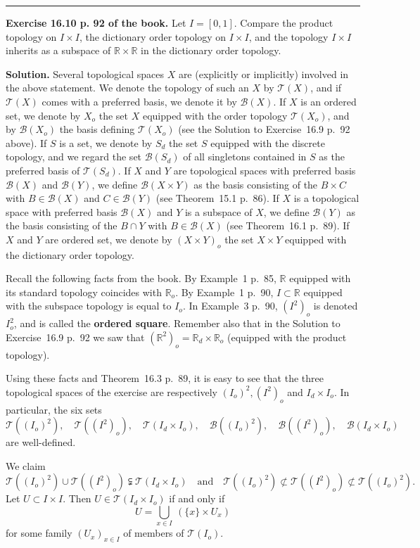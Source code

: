 \documentclass[12pt,letterpaper]{article}
\newcommand{\B}{\mathcal B}
\newcommand{\hs}{\bigskip\hrule\medskip}
\newcommand{\mc}{\mathcal}
\newcommand{\noi}{\noindent}%
\newcommand{\R}{\mathbb R}
\newcommand{\T}{\mathcal T}
\begin{document}
\hs


\noi\textbf{Exercise 16.10 p. 92 of the book.} Let $I=[0,1]$. Compare the product topology on $I\times I$, the dictionary order topology on $I\times I$, and the topology $I\times I$ inherits as a subspace of $\R\times\R$ in the dictionary order topology. 

\noi\textbf{Solution.} Several topological spaces $X$ are (explicitly or implicitly) involved in the above statement. We denote the topology of such an $X$ by $\T(X)$, and if $\T(X)$ comes with a preferred basis, we denote it by $\B(X)$. If $X$ is an ordered set, we denote by $X_o$ the set $X$ equipped with the order topology $\T(X_o)$, and by $\B(X_o)$ the basis defining $\mc T(X_o)$ (see the Solution to Exercise~16.9 p.~92 above). If $S$ is a set, we denote by $S_d$ the set $S$ equipped with the discrete topology, and we regard the set $\mc B(S_d)$ of all singletons contained in $S$ as the preferred basis of $\mc T(S_d)$. If $X$ and $Y$ are topological spaces with preferred basis $\B(X)$ and $\B(Y)$, we define $\B(X\times Y)$ as the basis consisting of the $B\times C$ with $B\in\mc B(X)$ and $C\in\mc B(Y)$ (see Theorem~15.1 p.~86). If $X$ is a topological space with preferred basis $\B(X)$ and $Y$ is a subspace of $X$, we define $\B(Y)$ as the basis consisting of the $B\cap Y$ with $B\in\mc B(X)$ (see Theorem~16.1 p.~89). If $X$ and $Y$ are ordered set, we denote by $(X\times Y)_o$ the set $X\times Y$ equipped with the dictionary order topology. 

Recall the following facts from the book. By Example~1 p.~85, $\R$ equipped with its standard topology coincides with $\R_o$. By Example~1 p.~90, $I\subset\R$ equipped with the subspace topology is equal to $I_o$. In Example~3 p.~90, $(I^2)_o$ is denoted $I_o^2$, and is called the \textbf{ordered square}. Remember also that in the Solution to Exercise~16.9 p.~92 we saw that $(\R^2)_o=\R_d\times\R_o$ (equipped with the product topology). 

Using these facts and Theorem~16.3 p.~89, it is easy to see that the three topological spaces of the exercise are respectively $(I_o)^2,(I^2)_o$ and $I_d\times I_o$. In particular, the six sets 
$$
\T((I_o)^2),\quad\T((I^2)_o),\quad\T(I_d\times I_o),\quad\B((I_o)^2),\quad\B((I^2)_o),\quad\B(I_d\times I_o)
$$ 
are well-defined. 

We claim 
$$
\mc T((I_o)^2)\cup\mc T((I^2)_o)\subsetneqq\mc T(I_d\times I_o)\quad\text{and}\quad\mc T((I_o)^2)\not\subset\mc T((I^2)_o)\not\subset\mc T((I_o)^2).
$$ 
Let $U\subset I\times I$. Then $U\in\mc T(I_d\times I_o)$ if and only if 
$$
U=\bigcup_{x\in I}\ (\{x\}\times U_x)
$$ 
for some family $(U_x)_{x\in I}$ of members of $\mc T(I_o)$. 
\end{document}
